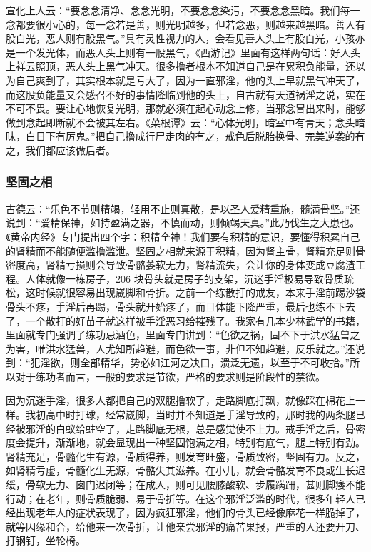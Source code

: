 宣化上人云：“要念念清净、念念光明，不要念念染污，不要念念黑暗。我们每一念都要很小心的，每一念若是善，则光明越多，但若念恶，则越来越黑暗。善人有股白光，恶人则有股黑气。”具有灵性视力的人，会看见善人头上有股白光，小孩亦是一个发光体，而恶人头上则有一股黑气，《西游记》里面有这样两句话：好人头上祥云照顶，恶人头上黑气冲天。很多撸者根本不知道自己是在累积负能量，还以为自己爽到了，其实根本就是亏大了，因为一直邪淫，他的头上早就黑气冲天了，而这股负能量又会感召不好的事情降临到他的头上，自古就有天道祸淫之说，实在不可不畏。要让心地恢复光明，那就必须在起心动念上修，当邪念冒出来时，能够做到念起即断就不会被其左右。《菜根谭》云：“心体光明，暗室中有青天；念头暗昧，白日下有厉鬼。”把自己撸成行尸走肉的有之，戒色后脱胎换骨、完美逆袭的有之，我们都应该做后者。

\subsubsection{坚固之相}

古德云：“乐色不节则精竭，轻用不止则真散，是以圣人爱精重施，髓满骨坚。”还说到：“爱精保神，如持盈满之器，不慎而动，则倾竭天真。”此乃伐生之大患也。《黄帝内经》专门提出四个字：积精全神！我们要有积精的意识，要懂得积累自己的肾精而不能随便滥撸滥泄。坚固之相就来源于积精，因为肾主骨，肾精充足则骨密度高，肾精亏损则会导致骨骼萎软无力，肾精流失，会让你的身体变成豆腐渣工程。人体就像一栋房子，206 块骨头就是房子的支架，沉迷手淫极易导致骨质疏松，这时候就很容易出现崴脚和骨折。之前一个练散打的戒友，本来手淫前踢沙袋骨头不疼，手淫后再踢，骨头就开始疼了，而且体能下降严重，最后也练不下去了，一个散打的好苗子就这样被手淫恶习给摧残了。我家有几本少林武学的书籍，里面就专门强调了练功忌酒色，里面专门讲到：“色欲之祸，固不下于洪水猛兽之为害，唯洪水猛兽，人尤知所趋避，而色欲一事，非但不知趋避，反乐就之。”还说到：“犯淫欲，则全部精华，势必如江河之决口，溃泛无遗，以至于不可收拾。”所以对于练功者而言，一般的要求是节欲，严格的要求则是阶段性的禁欲。

因为沉迷手淫，很多人都把自己的双腿撸软了，走路脚底打飘，就像踩在棉花上一样。我初高中时打球，经常崴脚，当时并不知道是手淫导致的，那时我的两条腿已经被邪淫的白蚁给蛀空了，走路脚底无根，总是感觉使不上力。戒手淫之后，骨密度会提升，渐渐地，就会显现出一种坚固饱满之相，特别有底气，腿上特别有劲。肾精充足，骨髓化生有源，骨质得养，则发育旺盛，骨质致密，坚固有力。反之，如肾精亏虚，骨髓化生无源，骨骼失其滋养。在小儿，就会骨骼发育不良或生长迟缓，骨软无力、囱门迟闭等；在成人，则可见腰膝酸软、步履蹒跚，甚则脚痿不能行动；在老年，则骨质脆弱、易于骨折等。在这个邪淫泛滥的时代，很多年轻人已经出现老年人的症状表现了，因为疯狂邪淫，他们的骨头已经像麻花一样脆掉了，就等因缘和合，给他来一次骨折，让他亲尝邪淫的痛苦果报，严重的人还要开刀、打钢钉，坐轮椅。

